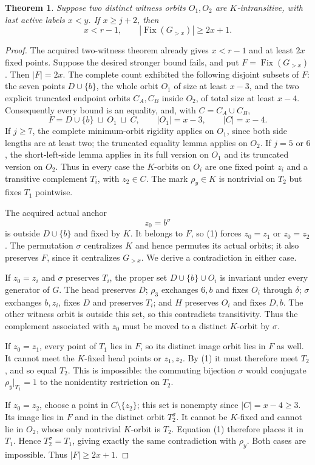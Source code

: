 \documentclass[11pt,a4paper]{article}
\newtheorem{theorem}[lemma]{Theorem}
\begin{document}
\begin{theorem}
Suppose two distinct witness orbits $O_1,O_2$
are $K$-intransitive, with last active labels
$x<y$. If $x\ge j+2$, then
\[
                  x<r-1,\qquad
                  |\operatorname{Fix}(G_{>x})|\ge2x+1.
\]
\end{theorem}
\begin{proof}
The acquired two-witness theorem already gives
$x<r-1$ and at least $2x$ fixed points. Suppose
the desired stronger bound fails, and put
$F=\operatorname{Fix}(G_{>x})$. Then $|F|=2x$.
The complete count exhibited the following disjoint
subsets of $F$: the seven points $D\cup\{b\}$,
the whole orbit $O_1$ of size at least $x-3$,
and the two explicit truncated endpoint orbits
$C_A,C_B$ inside $O_2$, of total size at least
$x-4$. Consequently every bound is an equality,
and, with $C=C_A\cup C_B$,
\[
 F=D\cup\{b\}\ \sqcup\ O_1\ \sqcup\ C,
 \qquad |O_1|=x-3,\qquad |C|=x-4.                 \tag{1}
\]
If $j\ge7$, the complete minimum-orbit rigidity
applies on $O_1$, since both side lengths are
at least two; the truncated equality lemma
applies on $O_2$. If $j=5$ or $6$, the short-left-side
lemma applies in its full version on $O_1$ and
its truncated version on $O_2$. Thus in every
case the $K$-orbits on $O_i$ are one fixed
point $z_i$ and a transitive complement $T_i$,
with $z_2\in C$.
The mark $\rho_y\in K$ is nontrivial on $T_2$
but fixes $T_1$ pointwise.

The acquired actual anchor
\[
                         z_0=b^\sigma
\]
is outside $D\cup\{b\}$ and fixed by $K$.
It belongs to $F$, so (1) forces $z_0=z_1$ or
$z_0=z_2$. The permutation $\sigma$ centralizes
$K$ and hence permutes its actual orbits; it
also preserves $F$, since it centralizes $G_{>x}$.
We derive a contradiction in either case.

If $z_0=z_i$ and $\sigma$ preserves $T_i$,
the proper set $D\cup\{b\}\cup O_i$ is invariant
under every generator of $G$. The head preserves
$D$; $\rho_3$ exchanges $6,b$ and fixes $O_i$
through $\delta$; $\sigma$ exchanges $b,z_i$,
fixes $D$ and preserves $T_i$; and $H$ preserves $O_i$ and
fixes $D,b$. The other witness orbit is outside
this set, so this contradicts transitivity.
Thus the complement associated with $z_0$ must
be moved to a distinct $K$-orbit by $\sigma$.

If $z_0=z_1$, every point of $T_1$ lies in $F$,
so its distinct image orbit lies in $F$ as well.
It cannot meet the $K$-fixed head points or
$z_1,z_2$. By (1) it must therefore meet $T_2$,
and so equal $T_2$. This is impossible: the
commuting bijection $\sigma$ would conjugate
$\rho_y|_{T_1}=1$ to the nonidentity restriction
on $T_2$.

If $z_0=z_2$, choose a point in $C\setminus\{z_2\}$;
this set is nonempty since $|C|=x-4\ge3$.
Its image lies in $F$ and in the distinct orbit
$T_2^\sigma$. It cannot be $K$-fixed and cannot
lie in $O_2$, whose only nontrivial $K$-orbit
is $T_2$. Equation (1) therefore places it in
$T_1$. Hence $T_2^\sigma=T_1$, giving exactly
the same contradiction with $\rho_y$.
Both cases are impossible. Thus $|F|\ge2x+1$.
\end{proof}
\end{document}
